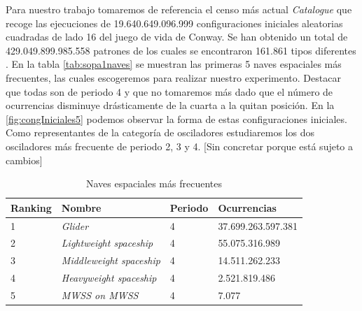\documentclass[../proyecto.tex]{memoir}
\begin{document}
Para nuestro trabajo tomaremos de referencia el censo más actual \textit{Catalogue} que recoge las ejecuciones de 19.640.649.096.999 configuraciones iniciales aleatorias cuadradas de lado 16 del juego de vida de Conway. Se han obtenido un total de 429.049.899.985.558 patrones de los cuales se encontraron 161.861 tipos diferentes \cite{sopa3}. En la tabla \autoref{tab:sopa1naves} se muestran las primeras 5 naves espaciales más frecuentes, las cuales escogeremos para realizar nuestro experimento. Destacar que todas son de periodo 4 y que no tomaremos más dado que el número de ocurrencias disminuye drásticamente de la cuarta a la quitan posición. En la \autoref{fig:congIniciales5} podemos observar la forma de estas configuraciones iniciales. Como representantes de la categoría de osciladores estudiaremos los dos osciladores más frecuente de periodo 2, 3 y 4. [Sin concretar porque está sujeto a cambios]

\begin{table}[]
\centering
\begin{tabular}{|l|l|l|l|}
\hline
Ranking & Nombre                          & Periodo & Ocurrencias    \\ \hline
1       & \textit{Glider}                 & 4       & 37.699.263.597.381 \\ \hline
2       & \textit{Lightweight spaceship}  & 4       & 55.075.316.989     \\ \hline
3       & \textit{Middleweight spaceship} & 4       & 14.511.262.233      \\ \hline
4       & \textit{Heavyweight spaceship}  & 4       & 2.521.819.486      \\ \hline
5       & \textit{MWSS on MWSS}  & 4       & 7.077      \\ \hline
\end{tabular}
\caption{Naves espaciales más frecuentes}
\label{tab:sopa1naves}
\end{table}
\end{document}
